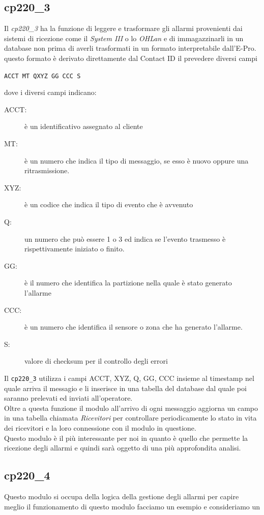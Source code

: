 \subsection{cp220\_3}
Il \emph{cp220\_3} ha la funzione di leggere e trasformare gli allarmi provenienti dai sistemi di ricezione come il \emph{System III} o lo \emph{OHLan} e di immagazzinarli in un database non prima di averli trasformati in un formato interpretabile dall'E-Pro. questo formato è derivato direttamente dal Contact ID il prevedere diversi campi
\begin{center}
	\texttt{ACCT MT QXYZ GG CCC S}
\end{center}
dove i diversi campi indicano:
\begin{description}
	\item[ACCT:] è un identificativo assegnato al cliente
	\item[MT:] è un numero che indica il tipo di messaggio, se esso è nuovo oppure una ritrasmissione.
	\item[XYZ:] è un codice che indica il tipo di evento che è avvenuto
	\item[Q:] un numero che può essere 1 o 3 ed indica se l'evento trasmesso è rispettivamente iniziato o finito.
	\item[GG:] è il numero che identifica la partizione nella quale è stato generato l'allarme
	\item[CCC:] è un numero che identifica il sensore o zona che ha generato l'allarme.
	\item[S:] valore di checksum per il controllo degli errori
\end{description}
Il \texttt{cp220\_3} utilizza i campi ACCT, XYZ, Q, GG, CCC insieme al timestamp nel quale arriva il messagio e li inserisce in una tabella del database dal quale poi saranno prelevati ed inviati all'operatore.\\
Oltre a questa funzione il modulo all'arrivo di ogni messaggio aggiorna un campo in una tabella chiamata \emph{Ricevitori} per controllare periodicamente lo stato in vita dei ricevitori e la loro connessione con il modulo in questione.\\
Questo modulo è il più interessante per noi in quanto è quello che permette la ricezione degli allarmi e quindi sarà oggetto di una più approfondita analisi.
\subsection{cp220\_4}
Questo modulo si occupa della logica della gestione degli allarmi per capire meglio il funzionamento di questo modulo facciamo un esempio e consideriamo un 
